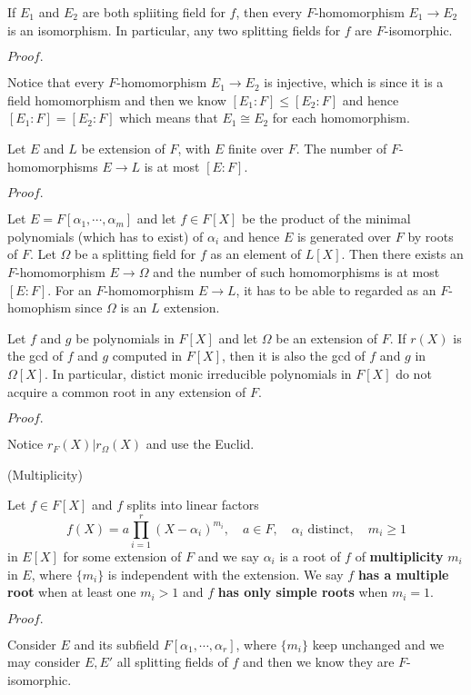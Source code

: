 \documentclass{article}
\newcommand{\Pf}[1]{$Proof.$\par}
\begin{document}
\begin{corollary}
    If $E_1$ and $E_2$ are both spliiting field for $f$, then every $F$-homomorphism $E_1 \to E_2$ is an isomorphism. In particular, any two splitting fields for $f$ are $F$-isomorphic.
\end{corollary}
\Pf\par
    Notice that every $F$-homomorphism $E_1 \to E_2$ is injective, which is since it is a field homomorphism and then we know $[E_1:F] \leq [E_2:F]$ and hence $[E_1:F] = [E_2:F]$ which means that $E_1 \cong E_2$ for each homomorphism.

\begin{corollary}
    Let $E$ and $L$ be extension of $F$, with $E$ finite over $F$. The number of $F$-homomorphisms $E\to L$ is at most $[E:F]$.
\end{corollary}
\Pf\par
    Let $E= F[\alpha_1,\cdots,\alpha_m]$ and let $f\in F[X]$ be the product of the minimal polynomials (which has to exist) of $\alpha_i$ and hence $E$ is generated over $F$ by roots of $F$. Let $\Omega$ be a splitting field for $f$ as an element of $L[X]$. Then there exists an $F$-homomorphism $E\to \Omega$ and the number of such homomorphisms is at most $[E:F]$. For an $F$-homomorphism $E\to L$, it has to be able to regarded as an $F$-homophism since $\Omega$ is an $L$ extension.

\begin{proposition}
    Let $f$ and $g$ be polynomials in $F[X]$ and let $\Omega$ be an extension of $F$. If $r(X)$ is the gcd of $f$ and $g$ computed in $F[X]$, then it is also the gcd of $f$ and $g$ in $\Omega[X]$. In particular, distict monic irreducible polynomials in $F[X]$ do not acquire a common root in any extension of $F$.
\end{proposition}
\Pf\par
    Notice $r_F(X)|r_{\Omega}(X)$ and use the Euclid.

\begin{definition}
    (Multiplicity)\par
    Let $f\in F[X]$ and $f$ splits into linear factors
    \[f(X) = a \prod_{i=1}^r (X-\alpha_i)^{m_i},\quad a\in F,\quad \alpha_i\text{ distinct},\quad m_i\geq 1\]
    in $E[X]$ for some extension of $F$ and we say $\alpha_i$ is a root of $f$ of \textbf{multiplicity} $m_i$ in $E$, where $\{m_i\}$ is independent with the extension. We say $f$ \textbf{has a multiple root} when at least one $m_i >1$ and $f$ \textbf{has only simple roots} when $m_i = 1$.
\end{definition}
\Pf\par
    Consider $E$ and its subfield $F[\alpha_1,\cdots,\alpha_r]$, where $\{m_i\}$ keep unchanged and we may consider $E,E'$ all splitting fields of $f$ and then we know they are $F$-isomorphic.
\end{document}
